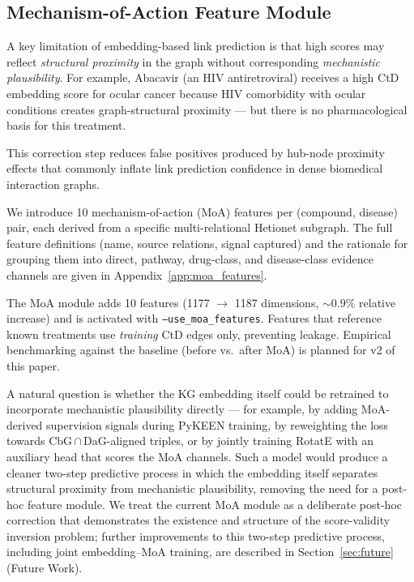 \documentclass[10pt,twocolumn]{article}
\begin{document}
\subsection{Mechanism-of-Action Feature Module}\label{sec:moa}

A key limitation of embedding-based link prediction is that high scores may reflect \textit{structural proximity} in the graph without corresponding \textit{mechanistic plausibility}. For example, Abacavir (an HIV antiretroviral) receives a high CtD embedding score for ocular cancer because HIV comorbidity with ocular conditions creates graph-structural proximity --- but there is no pharmacological basis for this treatment.

This correction step reduces false positives produced by hub-node proximity effects that commonly inflate link prediction confidence in dense biomedical interaction graphs.

We introduce 10 mechanism-of-action (MoA) features per (compound, disease) pair, each derived from a specific multi-relational Hetionet subgraph. The full feature definitions (name, source relations, signal captured) and the rationale for grouping them into direct, pathway, drug-class, and disease-class evidence channels are given in Appendix~\ref{app:moa_features}.

The MoA module adds 10 features (1177 $\to$ 1187 dimensions, ${\sim}0.9\%$ relative increase) and is activated with \texttt{--use\_moa\_features}. Features that reference known treatments use \textit{training} CtD edges only, preventing leakage. Empirical benchmarking against the baseline (before vs.\ after MoA) is planned for v2 of this paper.

A natural question is whether the KG embedding itself could be retrained to incorporate mechanistic plausibility directly --- for example, by adding MoA-derived supervision signals during PyKEEN training, by reweighting the loss towards CbG\,$\cap$\,DaG-aligned triples, or by jointly training RotatE with an auxiliary head that scores the MoA channels. Such a model would produce a cleaner two-step predictive process in which the embedding itself separates structural proximity from mechanistic plausibility, removing the need for a post-hoc feature module. We treat the current MoA module as a deliberate post-hoc correction that demonstrates the existence and structure of the score-validity inversion problem; further improvements to this two-step predictive process, including joint embedding--MoA training, are described in Section~\ref{sec:future} (Future Work).
\end{document}
